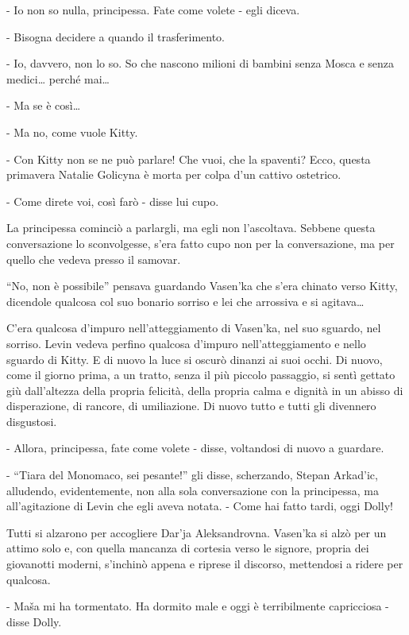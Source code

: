 - Io non so nulla, principessa. Fate come volete - egli diceva. 

- Bisogna decidere a quando il trasferimento. 

- Io, davvero, non lo so. So che nascono milioni di bambini senza Mosca e senza medici\ldots{} perché mai\ldots{} 

- Ma se è così\ldots{} 

- Ma no, come vuole Kitty. 

- Con Kitty non se ne può parlare! Che vuoi, che la spaventi? Ecco, questa primavera Natalie Golicyna è morta per colpa d'un cattivo ostetrico. 

- Come direte voi, così farò - disse lui cupo. 

La principessa cominciò a parlargli, ma egli non l'ascoltava. Sebbene questa conversazione lo sconvolgesse, s'era fatto cupo non per la conversazione, ma per quello che vedeva presso il samovar. 

``No, non è possibile'' pensava guardando Vasen'ka che s'era chinato verso Kitty, dicendole qualcosa col suo bonario sorriso e lei che arrossiva e si agitava\ldots{} 

C'era qualcosa d'impuro nell'atteggiamento di Vasen'ka, nel suo sguardo, nel sorriso. Levin vedeva perfino qualcosa d'impuro nell'atteggiamento e nello sguardo di Kitty. E di nuovo la luce si oscurò dinanzi ai suoi occhi. Di nuovo, come il giorno prima, a un tratto, senza il più piccolo passaggio, si sentì gettato giù dall'altezza della propria felicità, della propria calma e dignità in un abisso di disperazione, di rancore, di umiliazione. Di nuovo tutto e tutti gli divennero disgustosi. 

- Allora, principessa, fate come volete - disse, voltandosi di nuovo a guardare. 

- ``Tiara del Monomaco, sei pesante!'' gli disse, scherzando, Stepan Arkad'ic, alludendo, evidentemente, non alla sola conversazione con la principessa, ma all'agitazione di Levin che egli aveva notata. - Come hai fatto tardi, oggi Dolly! 

Tutti si alzarono per accogliere Dar'ja Aleksandrovna. Vasen'ka si alzò per un attimo solo e, con quella mancanza di cortesia verso le signore, propria dei giovanotti moderni, s'inchinò appena e riprese il discorso, mettendosi a ridere per qualcosa. 

- Maša mi ha tormentato. Ha dormito male e oggi è terribilmente capricciosa - disse Dolly. 

